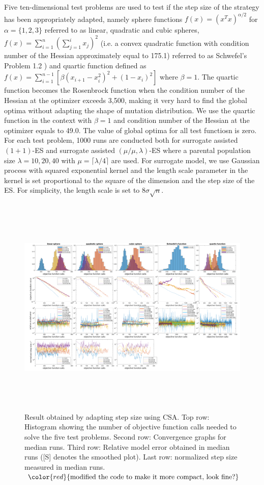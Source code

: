 Five ten-dimensional test problems are used to test if the step size of the strategy has been appropriately adapted, namely sphere functions $f(x) = (x^Tx)^{\alpha/2}$ for $\alpha = \{1,2,3 \}$ referred to as linear, quadratic and cubic spheres, $f(x) = \sum_{i=1}^n(\sum_{j=1}^i x_j)^2$ (i.e. a convex quadratic function with condition number of the Hessian approximately equal to 175.1) referred to as Schwefel's Problem 1.2 \cite{Schwefel:1981:NOC:539468}) and quartic function \cite{DBLP:conf/ppsn/KayhaniA18} defined as $f(x) = \sum_{i=1}^{n-1} \left[ \beta(x_{i+1} -x_i^2)^2 + (1-x_i)^2 \right]$ where $\beta = 1$. The quartic function becomes the Rosenbrock function when the condition number of the Hessian at the optimizer exceeds 3,500, making it very hard to find the global optima without adapting the shape of mutation distribution. We use the quartic function in the context with $\beta=1$  and condition number of the Hessian at the optimizer equals to 49.0. The value of global optima for all test functiosn is zero. For each test problem, 1000 runs are conducted both for surrogate assisted $(1+1)$-ES and surrogate assisted $(\mu/\mu,\lambda)$-ES where a parental population size $\lambda=10,20,40$ with $\mu = \lceil \lambda / 4 \rceil$ are used. For surrogate model, we use Gaussian process with squared exponential kernel and the length scale parameter in the kernel is set proportional to the square of the dimension and the step size of the ES. For simplicity, the length scale is set to $8 \sigma \sqrt{n}$.




\begin{center}
\begin{figure}
\includegraphics[height=4.2in, width=6in]{merged_plot_v4}
\caption{Result obtained by adapting step size using CSA. Top row: Histogram showing the number of objective function calls needed to solve the five test problems. Second row: Convergence graphs for median runs. Third row: Relative model error obtained in median runs ([S] denotes the smoothed plot). Last row: normalized step size measured in median runs. 
$\color{red}{\text{modified the code to make it more compact, look fine?}}$}
\label{fig:merged_plot}
\end{figure}
\end{center}



